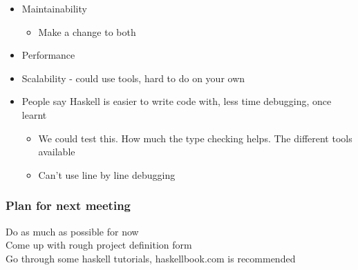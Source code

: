 \begin{itemize}
  \item Maintainability
  \begin{itemize}
    \item Make a change to both
  \end{itemize}
  \item Performance
  \item Scalability - could use tools, hard to do on your own
  \item People say Haskell is easier to write code with, less time debugging, once learnt
  \begin{itemize}
    \item We could test this. How much the type checking helps. The different tools available
    \item Can't use line by line debugging
  \end{itemize}
\end{itemize}

\subsubsection{Plan for next meeting}

Do as much as possible for now\\
Come up with rough project definition form\\
Go through some haskell tutorials, haskellbook.com is recommended
